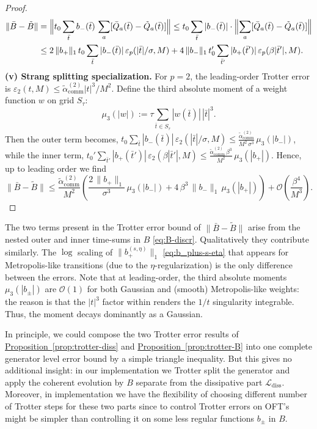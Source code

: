 \begin{proof}
    \begin{align*}
        \|\bar{B} - \tilde{B}\|
    &= \Bigl\|t_0 \sum_{\bar{t}} b_-(\bar{t})\, \sum_a [\bar{Q}_a(\bar{t}) - \tilde{Q}_a(\bar{t})]\Bigr\|
    \leq t_0 \sum_{\bar{t}} |b_-(\bar{t})| \cdot \Bigl\|\sum_a [\bar{Q}_a(\bar{t}) - \tilde{Q}_a(\bar{t})]\Bigr\| \\
    & \leq 2\,\|b_+\|_1\, t_0 \sum_{\bar{t}} |b_-(\bar{t})|\, \varepsilon_p(|\bar{t}|/\sigma, M)
    + 4\,\|b_-\|_1\, t_0' \sum_{\bar{t}'} |b_+(\bar{t}')|\, \varepsilon_p(\beta|\bar{t}'|, M).
    \end{align*}    
    \noindent\textbf{(v) Strang splitting specialization.} For $p = 2$, the leading-order Trotter error is $\varepsilon_2(t, M) \leq \tilde{\alpha}_{\mathrm{comm}}^{(2)}|t|^3/M^2$. Define the third absolute moment of a weight function $w$ on grid $S_{\tau}$:
    $$
    \mu_3(|w|) := \tau \sum_{\bar{t} \in S_\tau} |w(\bar{t})|\, |\bar{t}|^3.
    $$
    Then the outer term becomes, $t_0 \sum_{\bar{t}} |b_-(\bar{t})|\, \varepsilon_2(|\bar{t}|/\sigma, M) \leq \frac{\tilde{\alpha}_{\mathrm{comm}}^{(2)}}{M^2\, \sigma^3}\, \mu_3(|b_-|)$, while the inner term, $t_0' \sum_{\bar{t}'} |b_+(\bar{t}')|\, \varepsilon_2(\beta|\bar{t}'|, M) \leq \frac{\tilde{\alpha}_{\mathrm{comm}}^{(2)}\, \beta^3}{M^2}\, \mu_3(|b_+|)$. Hence, up to leading order we find
    $$
    \|\bar{B} - \tilde{B}\|
    \leq \frac{\tilde{\alpha}_{\mathrm{comm}}^{(2)}}{M^2}
    \left(
    \frac{2\,\|b_+\|_1}{\sigma^3}\, \mu_3(|b_-|)
    + 4\,\beta^3\, \|b_-\|_1\, \mu_3(|b_+|)
    \right)
    + \mathcal{O}\!\left(\frac{\beta^4}{M^3}\right).
    $$
\end{proof}
The two terms present in the Trotter error bound of $\|\bar{B} - \tilde{B}\|$ arise from the nested outer and inner time-sums in $B$ \eqref{eq:B-discr}. Qualitatively they contribute similarly. The $\log$ scaling of $\|b^{(s, \eta)}_+\|_1$ \eqref{eq:b_plus-s-eta} that appears for Metropolis-like transitions (due to the $\eta$-regularization) is the only difference between the errors. Note that at leading-order, the third absolute moments $\mu_3(|b_\pm|)$ are $\mathcal{O}(1)$ for both Gaussian and (smooth) Metropolis-like weights: the reason is that the $|t|^3$ factor within renders the $1 / t$ singularity integrable. Thus, the moment decays dominantly as a Gaussian.

In principle, we could compose the two Trotter error results of \hyperref[prop:trotter-diss]{Proposition~\ref*{prop:trotter-diss}} and \hyperref[prop:trotter-B]{Proposition~\ref*{prop:trotter-B}} into one complete generator level error bound by a simple triangle inequality. But this gives no additional insight: in our implementation we Trotter split the generator and apply the coherent evolution by $B$ separate from the dissipative part $\mathcal{L}_\text{diss}$. Moreover, in implementation we have the flexibility of choosing different number of Trotter steps for these two parts since to control Trotter errors on OFT's might be simpler than controlling it on some less regular functions $b_\pm$ in $B$.

